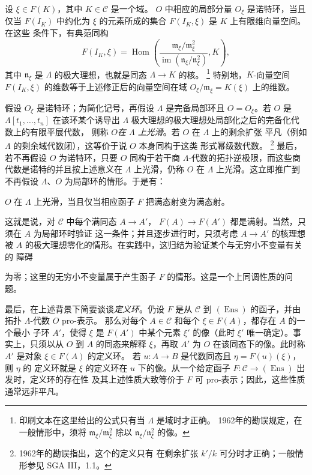 设 $\xi\in F(K)$，其中 $K\in\mathcal C$ 是一个域。
$O$ 中相应的局部分量 $O_\xi$ 是诺特环，当且仅当 $F(I_K)$ 中约化为
$\xi$ 的元素所成的集合 $F(I_K,\xi)$ 是 $K$ 上有限维向量空间。在这些
条件下，有典范同构
\[
  F(I_K,\xi)=
  \operatorname{Hom}\!\left(
    \frac{\mathfrak m_\xi/\mathfrak m_\xi^2}
         {\operatorname{im}(\mathfrak n_\xi/\mathfrak n_\xi^2)},K
  \right),
\]
其中 $\mathfrak n_\xi$ 是 $\Lambda$ 的极大理想，也就是同态
$\Lambda\longrightarrow K$ 的核。
\footnote{印刷文本在这里给出的公式只有当 $\Lambda$ 是域时才正确。
1962年的勘误规定，在一般情形中，须将
$\mathfrak m_\xi/\mathfrak m_\xi^2$ 除以
$\mathfrak n_\xi/\mathfrak n_\xi^2$ 的像。}
特别地，$K$-向量空间 $F(I_K,\xi)$ 的维数等于上述修正后的向量空间在域
$O_\xi/\mathfrak m_\xi=K(\xi)$ 上的维数。

假设 $O_\xi$ 是诺特环；为简化记号，再假设 $\Lambda$ 是完备局部环且
$O=O_\xi$。若 $O$ 是 $\Lambda[t_1,\ldots,t_n]$ 在该环某个诱导出
$\Lambda$ 极大理想的极大理想处局部化之后的完备化代数上的有限平展代数，
则称 $O$\emph{在 $\Lambda$ 上光滑}。若 $O$ 在 $\Lambda$ 上的剩余扩张
平凡（例如 $\Lambda$ 的剩余域代数闭），这等价于说 $O$ 本身同构于这类
形式幂级数代数。
\footnote{1962年的勘误指出，这个的定义只有
在剩余扩张 $k'/k$ 可分时才正确；一般情形参见 SGA III，1.1。}
最后，若不再假设 $O$ 为诺特环，只要 $O$ 同构于若干商
$\Lambda$-代数的拓扑逆极限，而这些商代数是诺特的并且按上述意义在
$\Lambda$ 上光滑，仍称 $O$ 在 $\Lambda$ 上光滑。这立即推广到不再假设
$\Lambda$、$O$ 为局部环的情形。于是有：

 $O$ 在 $\Lambda$ 上光滑，当且仅当相应函子 $F$
把满态射变为满态射。

这就是说，对 $\mathcal C$ 中每个满同态 $A\longrightarrow A'$，
$F(A)\longrightarrow F(A')$ 都是满射。当然，只须在 $A$ 为局部环时验证
这一条件；并且逐步进行时，只须考虑 $A\longrightarrow A'$ 的核理想被
$A$ 的极大理想零化的情形。在实践中，这归结为验证某个与无穷小不变量有关的
障碍

为零；这里的无穷小不变量属于产生函子 $F$ 的情形。这是一个上同调性质的问题。

最后，在上述背景下简要谈谈\emph{定义环}。仍设 $F$ 是从 $\mathcal C$ 到
$(\operatorname{Ens})$ 的函子，并由拓扑 $\Lambda$-代数 $O$ pro-表示。
那么对每个 $A\in\mathcal C$ 和每个 $\xi\in F(A)$，都存在 $A$ 的一个最小
子环 $A'$，使得 $\xi$ 是 $F(A')$ 中某个元素 $\xi'$ 的像（此时 $\xi'$
唯一确定）。事实上，只须以从 $O$ 到 $A$ 的同态来解释 $\xi$，再取
$A'$ 为 $O$ 在该同态下的像。此时称 $A'$ 是对象 $\xi\in F(A)$ 的定义环。
若 $u:A\longrightarrow B$ 是代数同态且 $\eta=F(u)(\xi)$，则 $\eta$ 的
定义环就是 $\xi$ 的定义环在 $u$ 下的像。从一个给定函子
$F:\mathcal C\longrightarrow(\operatorname{Ens})$ 出发时，定义环的存在性
及其上述性质大致等价于 $F$ 可 pro-表示；因此，这些性质通常远非平凡。

